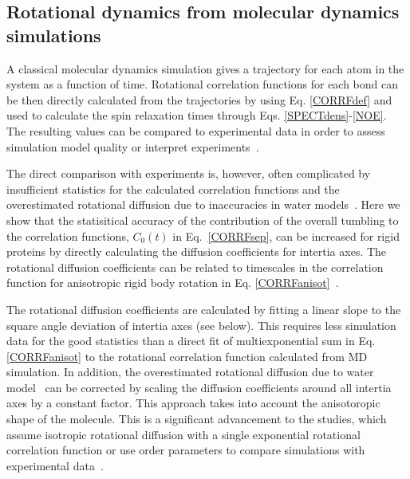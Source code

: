 \documentclass[pre,aps,floatfix,authordate1-4,twocolumn]{revtex4-1}
\begin{document}
\subsection{Rotational dynamics from molecular dynamics simulations}\label{MDanalysis}
A classical molecular dynamics simulation gives a trajectory for each atom in
the system as a function of time. Rotational correlation functions for each bond
can be then directly calculated from the trajectories by using Eq. \ref{CORRFdef}
and used to calculate the spin relaxation times through Eqs. \ref{SPECTdens}-\ref{NOE}.
The resulting values can be compared to experimental data in order to assess simulation model
quality \cite{best04,showalter07a,showalter07b,maragakis08,trbovic08,fisette12} or
interpret experiments~\cite{fisette12}.

The direct comparison with experiments is, however, often complicated by
insufficient statistics for the calculated correlation functions and the overestimated
rotational diffusion due to inaccuracies in water models~\cite{wong08,anderson12}.
Here we show that the statisitical accuracy of the contribution of the
overall tumbling to the correlation functions, $C_0(t)$ in Eq.~\ref{CORRFsep}, can be increased for
rigid proteins by directly calculating the diffusion coefficients for intertia axes.
The rotational diffusion coefficients can be related to timescales
in the correlation function for anisotropic rigid body rotation
in Eq. \ref{CORRFanisot}~\cite{woessner62,Note1}.

The rotational diffusion coefficients are calculated by fitting a linear slope to the 
square angle deviation of intertia axes (see below). This requires less simulation data
for the good statistics than a direct fit of multiexponential sum in Eq. \ref{CORRFanisot}
to the rotational correlation function calculated from MD simulation.
In addition, the overestimated rotational diffusion due to water model~\cite{wong08} can
be corrected by scaling the diffusion coefficients around all intertia axes
by a constant factor. This approach takes into account the anisotoropic shape of
the molecule. This is a significant advancement to the studies, which assume
isotropic rotational diffusion with a single exponential rotational correlation
function \cite{showalter07a,showalter07b,maragakis08,gu14,allner15} or
use order parameters to compare simulations with experimental data~\cite{gu14,maragakis08,trbovic08,best04}.
\end{document}
